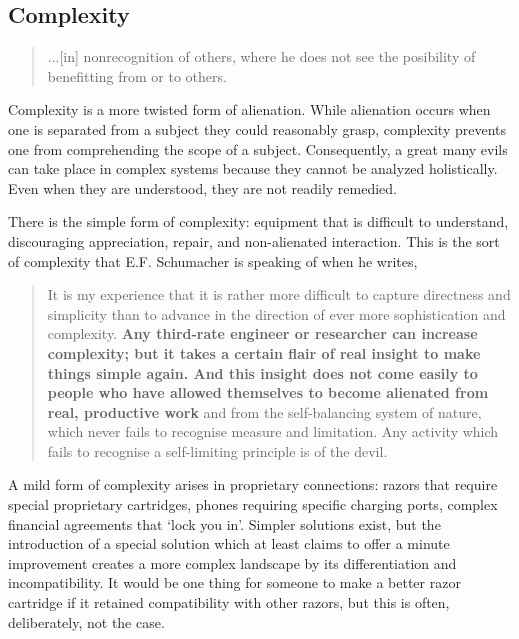\documentclass[letterpaper]{article}
\begin{document}

\subsection{Complexity}
\begin{quote}
  ...[in] nonrecognition of others, where he does not see the posibility of benefitting from or to others.
\end{quote}

Complexity is a more twisted form of alienation. While alienation occurs when one is separated from a subject they could reasonably grasp, complexity prevents one from comprehending the scope of a subject. Consequently, a great many evils can take place in complex systems because they cannot be analyzed holistically. Even when they are understood, they are not readily remedied.

There is the simple form of complexity: equipment that is difficult to understand, discouraging appreciation, repair, and non-alienated interaction. This is the sort of complexity that E.F. Schumacher is speaking of when he writes,

\begin{quote}
  It is my experience that it is rather more difficult to capture directness and simplicity than to advance in the direction of ever more sophistication and complexity. \textbf{Any third-rate engineer or researcher can increase complexity; but it takes a certain flair of real insight to make things simple again. And this insight does not come easily to people who have allowed themselves to become alienated from real, productive work} and from the self-balancing system of nature, which never fails to recognise measure and limitation. Any activity which fails to recognise a self-limiting principle is of the devil.
\end{quote}

A mild form of complexity arises in proprietary connections: razors that require special proprietary cartridges, phones requiring specific charging ports, complex financial agreements that `lock you in'. Simpler solutions exist, but the introduction of a special solution which at least claims to offer a minute improvement creates a more complex landscape by its differentiation and incompatibility. It would be one thing for someone to make a better razor cartridge if it retained compatibility with other razors, but this is often, deliberately, not the case.
\end{document}
